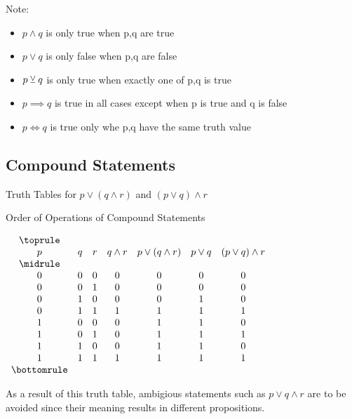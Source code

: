 \documentclass[../../../../main.tex]{subfiles}
\begin{document}
Note:
\begin{itemize}
    \item $p \land q$ is only true when p,q are true
    \item $p \lor q$ is only false when p,q are false
    \item $p \veebar q$ is only true when exactly one of p,q is true
    \item $p \implies q$ is true in all cases except when p is true and q is false
    \item $p \iff q$ is true only whe p,q have the same truth value
\end{itemize}

\subsection{Compound Statements}

\begin{table}[!htb]
    \caption{Truth Tables for $p \lor (q \land r)$ and $(p \lor q) \land r$}
    \centering
    \begin{subtable}{\linewidth}
        \centering
        \caption*{Order of Operations of Compound Statements}
        \label{tbl:logical-order-of-ops}
        $\begin{array}{ *{7}{c} }
            \toprule \\
            p & q & r & q \land r & p \lor (q \land r) & p \lor q & (p \lor q) \land r \\
            \midrule \\
            0 & 0 & 0 & 0 & 0 & 0 & 0 \\
            0 & 0 & 1 & 0 & 0 & 0 & 0 \\
            0 & 1 & 0 & 0 & 0 & 1 & 0 \\
            0 & 1 & 1 & 1 & 1 & 1 & 1 \\
            1 & 0 & 0 & 0 & 1 & 1 & 0 \\
            1 & 0 & 1 & 0 & 1 & 1 & 1 \\
            1 & 1 & 0 & 0 & 1 & 1 & 0 \\
            1 & 1 & 1 & 1 & 1 & 1 & 1 \\
            \bottomrule
        \end{array}$
    \end{subtable}%
\end{table}

As a result of this truth table, ambigious statements
such as $p \lor q \land r$ are to be avoided since their
meaning results in different propositions.
\end{document}
